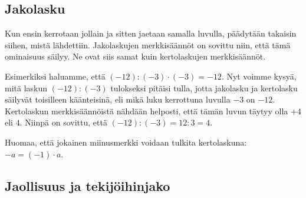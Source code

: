 \subsection*{Jakolasku}

Kun ensin kerrotaan jollain ja sitten jaetaan samalla luvulla, päädytään takaisin siihen, mistä lähdettiin. Jakolaskujen merkkisäännöt on sovittu niin, että tämä ominaisuus säilyy. Ne ovat siis samat kuin kertolaskujen merkkisäännöt.

Esimerkiksi haluamme, että $(-12):(-3)\cdot (-3)=-12$. Nyt voimme kysyä, mitä laskun $(-12):(-3)$ tulokseksi pitäisi tulla, jotta jakolasku ja kertolasku säilyvät toisilleen käänteisinä, eli mikä luku kerrottuna luvulla $-3$ on $-12$. Kertolaskun merkkisäännöistä nähdään helposti, että tämän luvun täytyy olla $+4$ eli $4$. Niinpä on sovittu, että $(-12):(-3)=12:3=4$.


Huomaa, että jokainen miinusmerkki voidaan tulkita kertolaskuna: $-a=(-1)\cdot a$.

\subsection*{Jaollisuus ja tekijöihinjako}

    
\begin{esimerkki}
\end{esimerkki}
   
